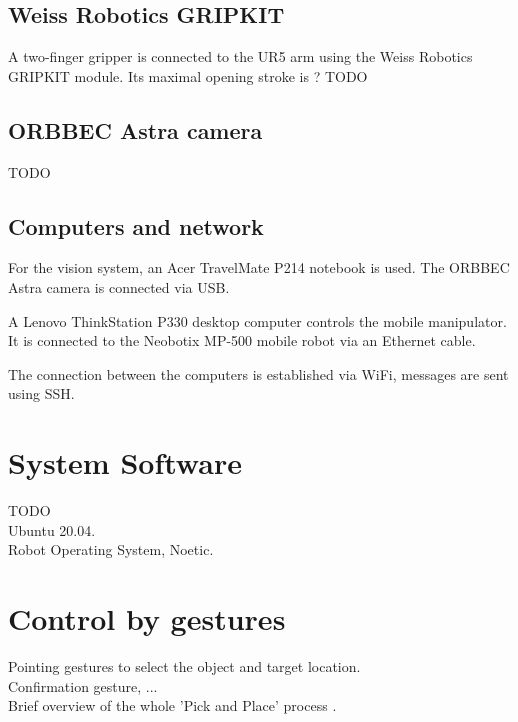 \subsection{Weiss Robotics GRIPKIT}

A two-finger gripper is connected to the UR5 arm using the Weiss Robotics GRIPKIT module. Its maximal opening stroke is ? TODO \par

\subsection{ORBBEC Astra camera}
TODO \\

\subsection{Computers and network}
For the vision system, an Acer TravelMate P214 notebook is used. The ORBBEC Astra camera is connected via USB.\par
A Lenovo ThinkStation P330 desktop computer controls the mobile manipulator. It is connected to the Neobotix MP-500 mobile robot via an Ethernet cable.\par
The connection between the computers is established via WiFi, messages are sent using SSH.\par

\section{System Software}
TODO\\
Ubuntu 20.04.\\
Robot Operating System, Noetic.\\

\section{Control by gestures}
Pointing gestures to select the object and target location.\\
Confirmation gesture, ...\\
Brief overview of the whole 'Pick and Place' process .\\